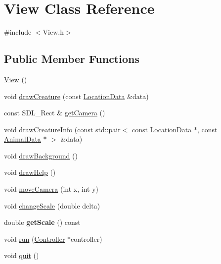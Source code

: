 \hypertarget{class_view}{}\section{View Class Reference}
\label{class_view}


{\ttfamily \#include $<$View.\+h$>$}

\subsection*{Public Member Functions}
\begin{DoxyCompactItemize}
\item 
\hyperlink{class_view_a44ad60a768422d3fa8fbd7576950080a}{View} ()
\item 
void \hyperlink{class_view_a8fa2e6421584793804587d5dc9492ba8}{draw\+Creature} (const \hyperlink{struct_location_data}{Location\+Data} \&data)
\item 
const S\+D\+L\+\_\+\+Rect \& \hyperlink{class_view_a63207db1dd71282045e0ecde0b93f33d}{get\+Camera} ()
\item 
void \hyperlink{class_view_ab9384ef6d65e0abdd481b88256bfe5ae}{draw\+Creature\+Info} (const std\+::pair$<$ const \hyperlink{struct_location_data}{Location\+Data} $\ast$, const \hyperlink{class_animal_data}{Animal\+Data} $\ast$ $>$ \&data)
\item 
void \hyperlink{class_view_a2271f4583f0e9373567d6dc9cd436484}{draw\+Background} ()
\item 
void \hyperlink{class_view_a485d5f07b947bb0405d311c177b3fd2b}{draw\+Help} ()
\item 
void \hyperlink{class_view_a20c20043ccfd30415139cb7d8aaba2fb}{move\+Camera} (int x, int y)
\item 
void \hyperlink{class_view_a558e949c9eae886d760f6b6bee8a6d16}{change\+Scale} (double delta)
\item 
\hypertarget{class_view_a175a5b623cb3bb324617dae4ef564a73}{}double {\bfseries get\+Scale} () const \label{class_view_a175a5b623cb3bb324617dae4ef564a73}

\item 
void \hyperlink{class_view_a81b9c32f706bfeb4cd918514fbf871ef}{run} (\hyperlink{class_controller}{Controller} $\ast$controller)
\item 
void \hyperlink{class_view_ab37e4bd6e99d390cffd1c2e96880db28}{quit} ()
\end{DoxyCompactItemize}
